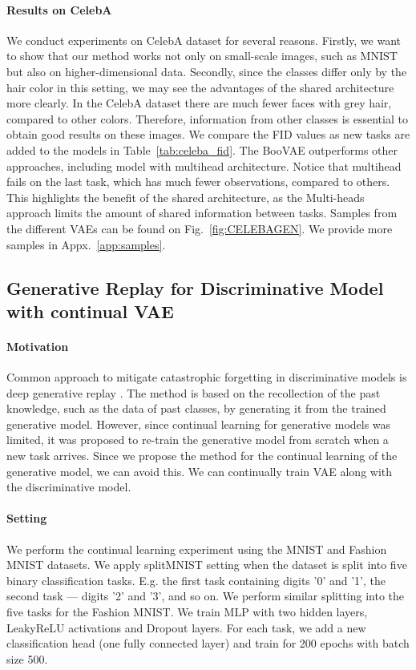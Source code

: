 \paragraph{Results on CelebA} We conduct experiments on CelebA dataset for several reasons. Firstly, we want to show that our method works not only on small-scale images, such as MNIST but also on higher-dimensional data. Secondly, since the classes differ only by the hair color in this setting, we may see the advantages of the shared architecture more clearly. In the CelebA dataset there are much fewer faces with grey hair, compared to other colors. Therefore, information from other classes is essential to obtain good results on these images. We compare the FID values as new tasks are added to the models in Table~\ref{tab:celeba_fid}. The BooVAE outperforms other approaches, including model with multihead architecture. Notice that multihead fails on the last task, which has much fewer observations, compared to others. This highlights the benefit of the shared architecture, as  the Multi-heads approach limits the amount of shared information between tasks. Samples from the different VAEs can be found on Fig.~\ref{fig:CELEBAGEN}. We provide more samples in Appx.~\ref{app:samples}.
\subsection{Generative Replay for Discriminative Model with continual VAE}
\paragraph{Motivation} Common approach to mitigate catastrophic forgetting in discriminative models is deep generative replay \citep{shin2017continual}. The method is based on the recollection of the past knowledge, such as the data of past classes, by generating it from the trained generative model. However, since continual learning for generative models was limited, it was proposed to re-train the generative model from scratch when a new task arrives. Since we propose the method for the continual learning of the generative model, we can avoid this. We can continually train VAE along with the discriminative model.
\paragraph{Setting} We perform the continual learning experiment using the MNIST and Fashion MNIST datasets. We apply splitMNIST setting when the dataset is split into five binary classification tasks. E.g. the first task containing digits ’0’ and ’1’, the second task --- digits ’2’ and ’3’, and so on. We perform similar splitting into the five tasks for the Fashion MNIST. We train MLP  with two hidden layers, LeakyReLU activations and Dropout layers. For each task, we add a new classification head (one fully connected layer) and train for 200 epochs with batch size 500.  
